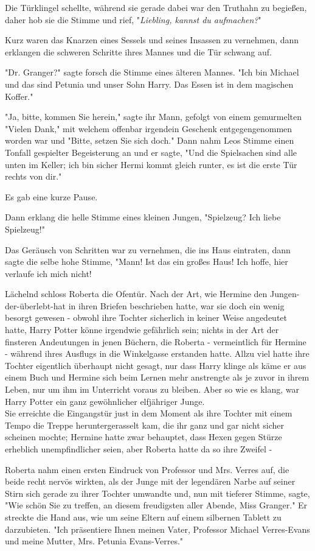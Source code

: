 {Die Türklingel schellte, während sie gerade dabei war den Truthahn zu begießen, daher hob sie die Stimme und rief, "\emph{Liebling, kannst du aufmachen?}"

Kurz waren das Knarzen eines Sessels und seines Insassen zu vernehmen, dann erklangen die schweren Schritte ihres Mannes und die Tür schwang auf.

"Dr. Granger?" sagte forsch die Stimme eines älteren Mannes. "Ich bin Michael und das sind Petunia und unser Sohn Harry. Das Essen ist in dem magischen Koffer."

"Ja, bitte, kommen Sie herein," sagte ihr Mann, gefolgt von einem gemurmelten "Vielen Dank," mit welchem offenbar irgendein Geschenk entgegengenommen worden war und "Bitte, setzen Sie sich doch." Dann nahm Leos Stimme einen Tonfall gespielter Begeisterung an und er sagte, "Und die Spielsachen sind alle unten im Keller; ich bin sicher Hermi kommt gleich runter, es ist die erste Tür rechts von dir."

Es gab eine kurze Pause.

Dann erklang die helle Stimme eines kleinen Jungen, "Spielzeug? Ich liebe Spielzeug!"

Das Geräusch von Schritten war zu vernehmen, die ins Haus eintraten, dann sagte die selbe hohe Stimme, "Mann! Ist das ein großes Haus! Ich hoffe, hier verlaufe ich mich nicht!

Lächelnd schloss Roberta die Ofentür. Nach der Art, wie Hermine den Jungen-der-überlebt-hat in ihren Briefen beschrieben hatte, war sie doch ein wenig besorgt gewesen - obwohl ihre Tochter sicherlich in keiner Weise angedeutet hatte, Harry Potter könne irgendwie gefährlich sein; nichts in der Art der finsteren Andeutungen in jenen Büchern, die Roberta - vermeintlich für Hermine - während ihres Ausflugs in die Winkelgasse erstanden hatte. Allzu viel hatte ihre Tochter eigentlich überhaupt nicht gesagt, nur dass Harry klinge als käme er aus einem Buch und Hermine sich beim Lernen mehr anstrengte als je zuvor in ihrem Leben, nur um ihm im Unterricht voraus zu bleiben. Aber so wie es klang, war Harry Potter ein ganz gewöhnlicher elfjähriger Junge.\\ Sie erreichte die Eingangstür just in dem Moment als ihre Tochter mit einem Tempo die Treppe heruntergerasselt kam, die ihr ganz und gar nicht sicher scheinen mochte; Hermine hatte zwar behauptet, dass Hexen gegen Stürze erheblich unempfindlicher seien, aber Roberta hatte da so ihre Zweifel -

Roberta nahm einen ersten Eindruck von Professor und Mrs. Verres auf, die beide recht nervös wirkten, als der Junge mit der legendären Narbe auf seiner Stirn sich gerade zu ihrer Tochter umwandte und, nun mit tieferer Stimme, sagte, "Wie schön Sie zu treffen, an diesem freudigsten aller Abende, Miss Granger." Er streckte die Hand aus, wie um seine Eltern auf einem silbernen Tablett zu darzubieten. "Ich präsentiere Ihnen meinen Vater, Professor Michael Verres-Evans und meine Mutter, Mrs. Petunia Evans-Verres."

}
